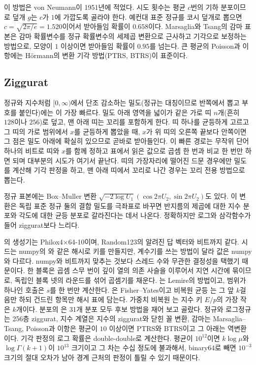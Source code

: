 이 방법은 von Neumann이 1951년에 적었다\cite{vonneumann1951}. 시도 횟수는 평균 $c$번의 기하 분포이므로 덮개 $g$는 $c$가 $1$에 가깝도록 골라야 한다. 예컨대 표준 정규를 코시 덮개로 뽑으면 $c=\sqrt{2\pi/e}=1.520$이어서 받아들임 확률이 $0.658$이다. Marsaglia와 Tsang의 감마 표본은 감마 확률변수를 정규 확률변수의 세제곱 변환으로 근사하고 기각으로 보정하는 방법으로, 모양이 $1$ 이상이면 받아들임 확률이 $0.95$를 넘는다\cite{marsaglia2000gamma}. 큰 평균의 Poisson과 이항에는 Hörmann의 변환 기각 방법(PTRS, BTRS)이 표준이다\cite{hormann1993poisson,hormann1993binomial}.

\subsection{Ziggurat}

정규와 지수처럼 $[0,\infty)$에서 단조 감소하는 밀도(정규는 대칭이므로 반쪽에서 뽑고 부호를 붙인다)에는 이 가장 빠르다\cite{marsaglia2000ziggurat}. 밀도 아래 영역을 넓이가 같은 가로 띠 $n$개(흔히 $128$이나 $256$)로 덮고, 맨 아래 띠는 꼬리를 포함하게 한다. 띠 하나를 균등하게 고르고 그 띠의 가로 범위에서 $x$를 균등하게 뽑았을 때, $x$가 위 띠의 오른쪽 끝보다 안쪽이면 그 점은 밀도 아래에 확실히 있으므로 곧바로 받아들인다. 이 빠른 경로는 무작위 단어 하나의 비트로 띠와 $x$를 함께 정하고 표에서 읽은 값으로 곱셈 한 번과 비교 한 번만 하면 되며 대부분의 시도가 여기서 끝난다. 띠의 가장자리에 떨어진 드문 경우에만 밀도를 계산해 기각 판정을 하고, 맨 아래 띠에서 꼬리로 나간 경우는 꼬리 전용 방법으로 뽑는다.

정규 표본에는 Box--Muller 변환 $\sqrt{-2\log U_1}(\cos2\pi U_2,\sin2\pi U_2)$도 있다\cite{box1958}. 이 변환은 독립 표준 정규 둘의 결합 밀도를 극좌표로 바꾸면 반지름의 제곱에 대한 지수 분포와 각도에 대한 균등 분포로 갈라진다는 데서 나온다. 정확하지만 로그와 삼각함수가 들어 ziggurat보다 느리다.

\begin{instardust}
의 생성기는 Philox4×64-10이며, Random123의 알려진 답 벡터와 비트까지 같다. 시드는 numpy의 와 같은 해시로 키를 만들지만, 계수기를 쓰는 방법이 달라 값은 numpy와 다르다. numpy와 비트까지 맞추는 것보다 스레드 수와 무관한 결정성을 택했기 때문이다. 한 블록은 곱셈 스무 번이 깊이 열의 의존 사슬을 이루어서 지연 시간에 묶이므로, 독립인 블록 넷의 라운드를 섞어 곱셈기를 채운다. 는 Lemire의 방법이고, 범위가 하나인 호출은 $s$를 한 번만 계산한다. 은 Fisher--Yates이고 비복원 균등 는 그 앞 $k$걸음만 하되 건드린 항목만 해시 표에 담는다. 가중치 비복원 는 지수 키 $E/p$의 가장 작은 $k$개이다. 분포의 은 31개 분포 모두 후보 방법을 재어 보고 골랐다. 정규와 로그정규는 256층 ziggurat, 지수 계열은 지수의 ziggurat와 닫힌 꼴 변환, 감마는 Marsaglia--Tsang, Poisson과 이항은 평균이 $10$ 이상이면 PTRS와 BTRS이고 그 아래는 역변환이다. 기각 판정의 로그 확률은 double-double로 계산한다. 평균이 $10^{12}$이면 $k\log\mu$와 $\log\Gamma(k+1)$이 $10^{13}$ 크기이고 그 차는 수십 정도에 불과해서, binary64로 빼면 $10^{-3}$ 크기의 절대 오차가 남아 경계 근처의 판정이 틀릴 수 있기 때문이다.
\end{instardust}

